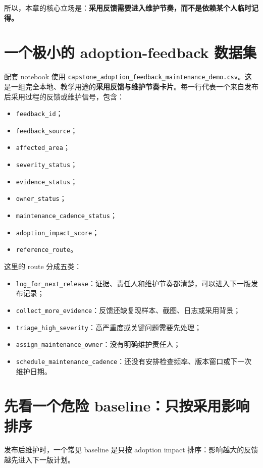 所以，本章的核心立场是：\textbf{采用反馈需要进入维护节奏，而不是依赖某个人临时记得。}

\section{一个极小的 adoption-feedback 数据集}

配套 notebook 使用 \nolinkurl{capstone_adoption_feedback_maintenance_demo.csv}。这是一组完全本地、教学用途的\textbf{采用反馈与维护节奏卡片}。每一行代表一个来自发布后采用过程的反馈或维护信号，包含：

\begin{itemize}
    \item \texttt{feedback\_id}；
    \item \texttt{feedback\_source}；
    \item \texttt{affected\_area}；
    \item \texttt{severity\_status}；
    \item \texttt{evidence\_status}；
    \item \texttt{owner\_status}；
    \item \texttt{maintenance\_cadence\_status}；
    \item \texttt{adoption\_impact\_score}；
    \item \texttt{reference\_route}。
\end{itemize}

这里的 route 分成五类：

\begin{itemize}
    \item \texttt{log\_for\_next\_release}：证据、责任人和维护节奏都清楚，可以进入下一版发布记录；
    \item \texttt{collect\_more\_evidence}：反馈还缺复现样本、截图、日志或采用背景；
    \item \texttt{triage\_high\_severity}：高严重度或关键问题需要先处理；
    \item \texttt{assign\_maintenance\_owner}：没有明确维护责任人；
    \item \texttt{schedule\_maintenance\_cadence}：还没有安排检查频率、版本窗口或下一次维护日期。
\end{itemize}

\section{先看一个危险 baseline：只按采用影响排序}

发布后维护时，一个常见 baseline 是只按 adoption impact 排序：影响越大的反馈越先进入下一版计划。

